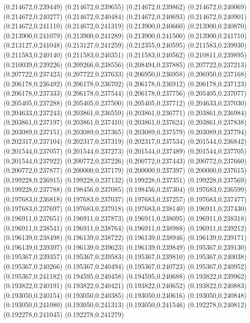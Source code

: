 (0.214672,0.239449)
(0.214672,0.239655)
(0.214672,0.239862)
(0.214672,0.240069)
(0.214672,0.240277)
(0.214672,0.240484)
(0.214672,0.240693)
(0.214672,0.240901)
(0.214672,0.241110)
(0.214672,0.241319)
(0.213900,0.240660)
(0.213900,0.240870)
(0.213900,0.241079)
(0.213900,0.241289)
(0.213900,0.241500)
(0.213900,0.241710)
(0.213127,0.241048)
(0.213127,0.241259)
(0.212355,0.240595)
(0.211583,0.239930)
(0.211583,0.240140)
(0.211583,0.240351)
(0.211583,0.240562)
(0.210811,0.239895)
(0.210039,0.239226)
(0.209266,0.238556)
(0.208494,0.237885)
(0.207722,0.237213)
(0.207722,0.237423)
(0.207722,0.237633)
(0.206950,0.236958)
(0.206950,0.237168)
(0.206178,0.236492)
(0.206178,0.236702)
(0.206178,0.236912)
(0.206178,0.237123)
(0.206178,0.237333)
(0.206178,0.237544)
(0.206178,0.237756)
(0.205405,0.237077)
(0.205405,0.237288)
(0.205405,0.237500)
(0.205405,0.237712)
(0.204633,0.237030)
(0.204633,0.237243)
(0.203861,0.236559)
(0.203861,0.236771)
(0.203861,0.236984)
(0.203861,0.237197)
(0.203861,0.237410)
(0.203861,0.237624)
(0.203861,0.237838)
(0.203089,0.237151)
(0.203089,0.237365)
(0.203089,0.237579)
(0.203089,0.237794)
(0.202317,0.237104)
(0.202317,0.237319)
(0.202317,0.237534)
(0.201544,0.236842)
(0.201544,0.237057)
(0.201544,0.237273)
(0.201544,0.237489)
(0.201544,0.237705)
(0.201544,0.237922)
(0.200772,0.237226)
(0.200772,0.237443)
(0.200772,0.237660)
(0.200772,0.237877)
(0.200000,0.237179)
(0.200000,0.237397)
(0.200000,0.237615)
(0.199228,0.236915)
(0.199228,0.237132)
(0.199228,0.237351)
(0.199228,0.237569)
(0.199228,0.237788)
(0.198456,0.237085)
(0.198456,0.237304)
(0.197683,0.236599)
(0.197683,0.236818)
(0.197683,0.237037)
(0.197683,0.237257)
(0.197683,0.237477)
(0.197683,0.237697)
(0.197683,0.237918)
(0.197683,0.238140)
(0.196911,0.237430)
(0.196911,0.237651)
(0.196911,0.237873)
(0.196911,0.238095)
(0.196911,0.238318)
(0.196911,0.238541)
(0.196911,0.238764)
(0.196911,0.238988)
(0.196911,0.239212)
(0.196139,0.238498)
(0.196139,0.238722)
(0.196139,0.238946)
(0.196139,0.239171)
(0.196139,0.239397)
(0.196139,0.239623)
(0.196139,0.239849)
(0.195367,0.239130)
(0.195367,0.239357)
(0.195367,0.239583)
(0.195367,0.239810)
(0.195367,0.240038)
(0.195367,0.240266)
(0.195367,0.240494)
(0.195367,0.240723)
(0.195367,0.240952)
(0.195367,0.241182)
(0.194595,0.240458)
(0.194595,0.240688)
(0.193822,0.239962)
(0.193822,0.240191)
(0.193822,0.240421)
(0.193822,0.240652)
(0.193822,0.240883)
(0.193050,0.240154)
(0.193050,0.240385)
(0.193050,0.240616)
(0.193050,0.240848)
(0.193050,0.241080)
(0.193050,0.241313)
(0.193050,0.241546)
(0.192278,0.240812)
(0.192278,0.241045)
(0.192278,0.241279)
